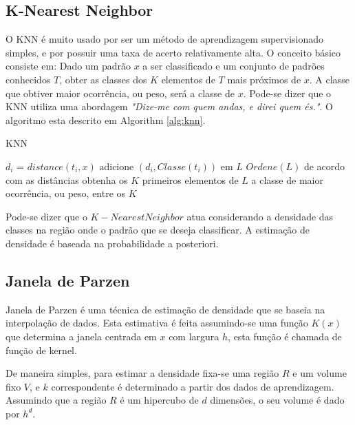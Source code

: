 \subsection{K-Nearest Neighbor}
\label{subsec:knn}

O KNN é muito usado por ser um método de aprendizagem supervisionado simples, e por possuir uma taxa de acerto relativamente alta. O conceito básico consiste em: Dado um padrão $x$ a ser classificado e um conjunto de padrões conhecidos $T$, obter as classes dos $K$ elementos de $T$ mais próximos de $x$. A classe que obtiver maior ocorrência, ou peso, será a classe de $x$. Pode-se dizer que o KNN utiliza uma abordagem \textit{"Dize-me com quem andas, e direi quem és."}. O algoritmo esta descrito em Algorithm \ref{alg:knn}.

\begin{algorithm}[H]
\caption{KNN}
\label{alg:knn}
\begin{algorithmic}[1]
\STATE  $d_i$ = $distance(t_i, x)$
\STATE  adicione $(d_i, Classe(t_i))$ em $L$
\ENDFOR
\STATE $Ordene(L)$ de acordo com as distâncias
\STATE obtenha os $K$ primeiros elementos de $L$
\RETURN a classe de maior ocorrência, ou peso, entre os $K$
\end{algorithmic}
\end{algorithm}


Pode-se dizer que o $K-Nearest Neighbor$ atua considerando a densidade das classes na região onde o padrão que se deseja classificar. A estimação de densidade é baseada na probabilidade a posteriori.

\subsection{Janela de Parzen}
\label{subsec:janeladeparzen}

Janela de Parzen é uma técnica de estimação de densidade que se baseia na interpolação de dados. Esta estimativa é feita assumindo-se uma função $K(x)$ que determina a janela centrada em $x$ com largura $h$, esta função é chamada de função de kernel.

De maneira simples, para estimar a densidade fixa-se uma região $R$ e um volume fixo $V$, e $k$ correspondente é determinado a partir dos dados de aprendizagem. Assumindo que a região $R$ é um hipercubo de $d$ dimensões, o seu volume é dado por $h^d$.

